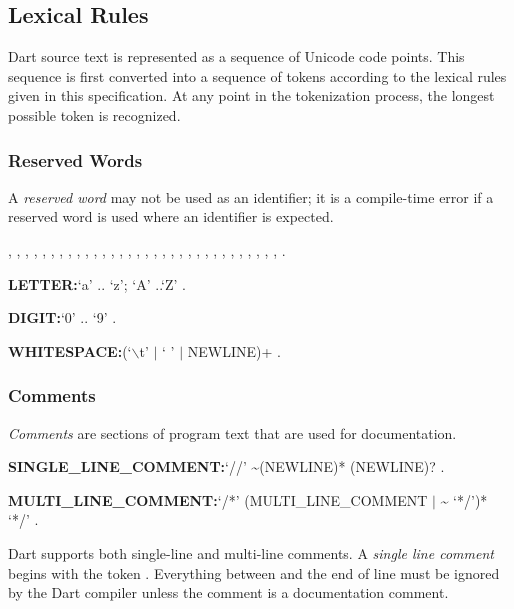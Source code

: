 \documentclass{article}
\begin{document}
\subsection{Lexical Rules}

\LMHash{}
Dart source text is represented as a sequence of Unicode code points.
This sequence is first converted into a sequence of tokens according to the lexical rules given in this specification.
At any point in the tokenization process, the longest possible token is recognized.


\subsubsection{Reserved Words}

\LMHash{}
A {\em reserved word} may not be used as an identifier; it is a compile-time error if a reserved word is used where an identifier is expected.

\ASSERT{}, \BREAK{}, \CASE{}, \CATCH{}, \CLASS{}, \CONST{}, \CONTINUE{}, \DEFAULT{}, \DO{}, \ELSE{}, \ENUM{}, \EXTENDS{}, \FALSE{}, \FINAL{}, \FINALLY{}, \FOR{}, \IF{}, \IN{}, \IS{}, \NEW{}, \NULL{}, \RETHROW, \RETURN{}, \SUPER{}, \SWITCH{}, \THIS{}, \THROW{}, \TRUE{}, \TRY{}, \VAR{}, \VOID{}, \WHILE{}, \WITH{}.

\begin{grammar}
{\bf LETTER:}`a' {\escapegrammar ..} `z';
  `A' {\escapegrammar ..}`Z'
  .

{\bf DIGIT:}`0' {\escapegrammar ..} `9'
  .

{\bf WHITESPACE:}(`$\backslash$t' $|$ ` ' $|$ NEWLINE)+
  .
\end{grammar}


\subsubsection{Comments}

\LMHash{}
{\em Comments} are sections of program text that are used for documentation.

\begin{grammar}
{\bf SINGLE\_LINE\_COMMENT:}`//' \~{}(NEWLINE)* (NEWLINE)?
  .

{\bf MULTI\_LINE\_COMMENT:}`/*' (MULTI\_LINE\_COMMENT $|$ \~{} `*/')* `*/'
  .
\end{grammar}

\LMHash{}
Dart supports both single-line and multi-line comments.
A {\em single line comment} begins with the token \code{//}.
Everything between \code{//} and the end of line must be ignored by the Dart compiler unless the comment is a documentation comment.
\end{document}
